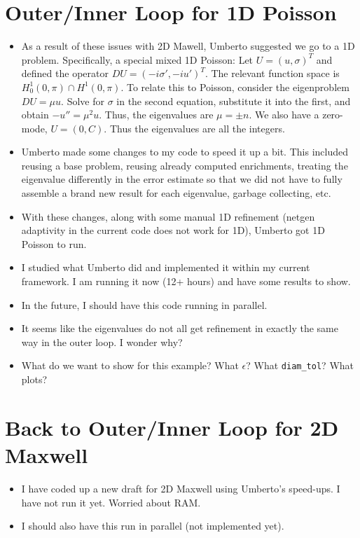 \documentclass[12pt,a4paper]{article}
\begin{document}
\section{Outer/Inner Loop for 1D Poisson}
\begin{itemize}
    \item As a result of these issues with 2D Mawell, Umberto suggested we go to a 1D problem. Specifically,  a special mixed 1D Poisson:
    Let $U = (u, \sigma)^T$ and defined the operator $DU = (-i\sigma', -iu')^T.$ The relevant function space is $H_0^1(0, \pi) \cap H^1(0, \pi).$ To relate this to Poisson, consider the eigenproblem $DU = \mu u.$ Solve for $\sigma$ in the second equation, substitute it into the first, and obtain $-u'' = \mu^2 u.$ Thus, the eigenvalues are $\mu = \pm n.$ We also have a zero-mode, $U = (0, C).$ Thus the eigenvalues are all the integers. 
    \item Umberto made some changes to my code to speed it up a bit. This included reusing a base problem, reusing already computed enrichments, treating the eigenvalue differently in the error estimate so that we did not have to fully assemble a brand new result for each eigenvalue, garbage collecting, etc.
    \item With these changes, along with some manual 1D refinement (netgen adaptivity in the current code does not work for 1D), Umberto got 1D Poisson to run.
    \item I studied what Umberto did and implemented it within my current framework. I am running it now (12+ hours) and have some results to show. 
    \item In the future, I should have this code running in parallel. 
    \item It seems like the eigenvalues do not all get refinement in exactly the same way in the outer loop. I wonder why? 
    \item What do we want to show for this example? What $\epsilon$? What \texttt{diam\_tol}? What plots?
\end{itemize}

\section{Back to Outer/Inner Loop for 2D Maxwell}
\begin{itemize}
    \item I have coded up a new draft for 2D Maxwell using Umberto's speed-ups. I have not run it yet. Worried about RAM.
    \item I should also have this run in parallel (not implemented yet). 
\end{itemize}
\end{document}
